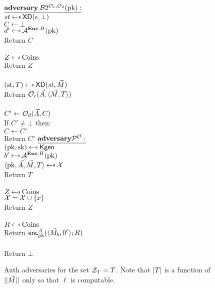 \begin{figure}[tbhp]
\begin{center}
{
 {$\adversaryv{\;\advB2^{\mathcal{O}_e,\mathcal{O}_d}(\pk)}$}\\
$st \getsr \mdalg(\epsilon,\bot)$\\
$C \gets \bot$\\
$d' \getsr \advA^{\encOracle,H}(\pk)$\\
Return $C$\\ 

\\
  $Z \getsr \mathrm{Coins}$\\
  Return $Z$\\

\queryl{$\encOracle(\vad,\vmsg)$}\\
$(\st, \umd) \getsr \mdalg(st,\vmsg)$\\
Return $\mathcal{O}_e(\vec{A}, \langle \vec{M},T\rangle)$\\

\\
$C' \gets \mathcal{O}_d(\vec{A}, C)$\\
If $C' \neq \bot$ then:\\
\nudge $C \gets C'$\\
Return $C'$
}
{
 $\adversaryv{\advP^{\mathcal{O}}}$\\
 $(\pk,\sk) \getsr \Kgen$\\
 $b' \getsr \advA^{\encOracle,H}(\pk)$\\
 $\langle \pk,\vad,\vmsg,T \rangle \getsr \cal X$\\
Return $T$\\

\\
  $Z \getsr \mathrm{Coins}$\\
  $\mathcal{X} = \mathcal{X} \cup \{x\}$ \\
  Return $Z$\\

\queryl{$\encOracle(\vad,\vmsg)$}\\
$R \getsr \mathrm{Coins}$\\
Return ${\mathsf{enc}}_{\mathrm{pk}}^{\vec{A}}(\langle \vec{M}_b,0^{\ell}\rangle;R)$\\

\\
Return $\bot$
}
\caption{Auth adversaries for the set $\mathcal{Z}_T = T$.
Note that $|T|$ is a function of $||\vec{M}||$ only so that $\ell$ is computable.}
\end{center}
\end{figure}



